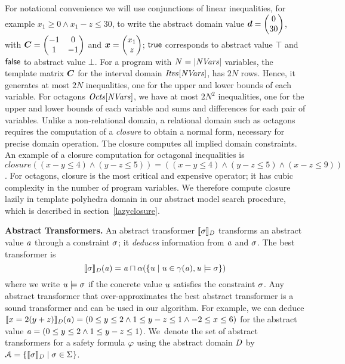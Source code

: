 For notational convenience we will use conjunctions of linear
inequalities, for example $x_1\geq 0 \wedge x_1-z\leq 30$, to write the
abstract domain value $\vec{\numabsval}=\vecv{0}{30}$,
with $\mat{C}=\qmat{-1}{0}{1}{-1}$ and $\vec{\numvar}=\vecv{x_1}{z}$; 
$\mathsf{true}$ corresponds to abstract value $\top$ and $\mathsf{false}$ to 
abstract value $\bot$.
%
For a program with $N=|\mathit{NVars}|$ variables, the template 
matrix ${\boldsymbol C}$ for the interval domain $\mathit{Itvs}[\mathit{NVars}]$, 
has $2N$ rows. Hence, it generates at most $2N$ inequalities, one
for the upper and lower bounds of each variable.
%
For octagons $\mathit{Octs}[\mathit{NVars}]$, we have at most $2N^2$
inequalities, one for the upper and lower bounds of each variable and
sums and differences for each pair of variables. 
Unlike a non-relational domain, a relational domain such as octagons 
requires the computation of a \emph{closure} to obtain a normal 
form, necessary for precise domain operation. 
The closure computes all implied domain constraints.  
An example of a closure computation for octagonal inequalities is
$\mathit{closure}((x-y \leq 4) \wedge (y-z \leq 5))=((x-y \leq 4) \wedge (y-z
\leq 5) \wedge (x-z \leq 9))$.
%
For octagons, closure is the most critical and expensive operator; it has  
cubic complexity in the number of program variables.  We therefore compute 
closure lazily in template polyhedra domain in our abstract model search 
procedure, which is described in section~\ref{lazyclosure}. 

\bigskip

\noindent\textbf{Abstract Transformers.}
An abstract transformer $\llbracket \sigma \rrbracket_{\mathit{D}}$ transforms an
abstract value $\mathit{a}$ through a constraint $\sigma$; it
\emph{deduces} information from $\mathit{a}$ and $\sigma$.  The best
transformer is
%
\begin{equation}\label{eq:abstrans}
\llbracket \sigma \rrbracket_{\mathit{D}}(\mathit{a})=\mathit{a}\sqcap\alpha(\{\mathit{u}\mid \mathit{u}\in\gamma(\mathit{a}), \mathit{u}\models \sigma\})
\end{equation}
 where we write 
$\mathit{u}\models \sigma$ if the concrete value $\mathit{u}$ satisfies the constraint $\sigma$.
%
Any abstract transformer that over-approximates the best abstract
transformer is a sound transformer and can be used in our algorithm.
%
For example, we can deduce $\llbracket x=2(y+z) \rrbracket_{\mathit{D}}(\mathit{a})=(0\leq y
\leq 2 \wedge\allowbreak 1 \leq y-z \leq 1\wedge\allowbreak -2\leq x\leq 6)$
for the abstract value $\mathit{a}=(0\leq y \leq 2 \wedge\allowbreak 1 \leq y-z
\leq 1)$.
%
We~denote the set of abstract transformers for a safety formula
$\varphi$ using the abstract domain $\mathit{D}$ by
$\mathcal{A}=\{\llbracket \sigma \rrbracket_{\mathit{D}}\mid
\sigma\in\Sigma\}$.
%


